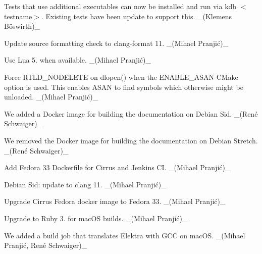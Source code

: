 \begin{DoxyItemize}
\item Tests that use additional executables can now be installed and run via {\ttfamily kdb $<$testname$>$}. Existing tests have been update to support this. \+\_\+(Klemens Böswirth)\+\_\+
\item Update source formatting check to clang-\/format 11. \+\_\+(Mihael Pranjić)\+\_\+
\end{DoxyItemize}


\begin{DoxyItemize}
\item Use Lua 5. when available. \+\_\+(Mihael Pranjić)\+\_\+
\item Force {\ttfamily R\+T\+L\+D\+\_\+\+N\+O\+D\+E\+L\+E\+TE} on dlopen() when the {\ttfamily E\+N\+A\+B\+L\+E\+\_\+\+A\+S\+AN} C\+Make option is used. This enables A\+S\+AN to find symbols which otherwise might be unloaded. \+\_\+(Mihael Pranjić)\+\_\+
\end{DoxyItemize}


\begin{DoxyItemize}
\item We added a Docker image for building the documentation on Debian Sid. \+\_\+(René Schwaiger)\+\_\+
\item We removed the Docker image for building the documentation on Debian Stretch. \+\_\+(René Schwaiger)\+\_\+
\item Add Fedora 33 Dockerfile for Cirrus and Jenkins CI. \+\_\+(Mihael Pranjić)\+\_\+
\item Debian Sid\+: update to clang 11. \+\_\+(Mihael Pranjić)\+\_\+
\end{DoxyItemize}


\begin{DoxyItemize}
\item Upgrade Cirrus Fedora docker image to Fedora 33. \+\_\+(Mihael Pranjić)\+\_\+
\item Upgrade to Ruby 3. for mac\+OS builds. \+\_\+(Mihael Pranjić)\+\_\+
\end{DoxyItemize}


\begin{DoxyItemize}
\item We added a build job that translates Elektra with G\+CC on mac\+OS. \+\_\+(Mihael Pranjić, René Schwaiger)\+\_\+
\end{DoxyItemize}


